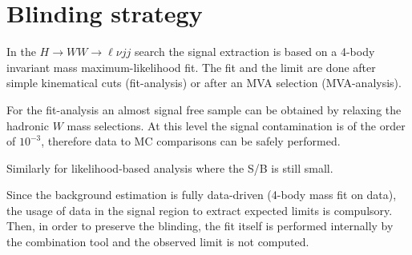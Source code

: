\section{Blinding strategy}
\label{sec:Blinding}

In the $H\rightarrow WW \rightarrow \ell{}\nu{}jj$ search the signal extraction 
is based on a 4-body invariant mass maximum-likelihood fit. The fit and the limit are done after simple
kinematical cuts (fit-analysis) or after an MVA selection (MVA-analysis).

For the fit-analysis an almost signal free sample can be obtained by relaxing the
hadronic $W$ mass selections. At this level the signal contamination is of the order of
$10^{-3}$, therefore data to MC comparisons can be safely performed.

Similarly for likelihood-based analysis where the S/B is still small.

Since the background estimation is fully data-driven (4-body mass fit on data),
the usage of data in the signal region to extract expected limits is compulsory.
Then, in order to preserve the blinding, the fit itself is performed internally by the
combination tool and the observed limit is not computed.
